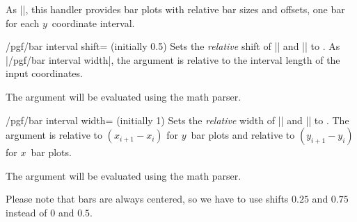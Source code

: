 \begin{command}{\pgfplothandlerxbarinterval}
    As |\pgfplothandlerybarinterval|, this handler provides bar plots with
    relative bar sizes and offsets, one bar for each $y$~coordinate interval.
\end{command}

\begin{key}{/pgf/bar interval shift= (initially 0.5)}
\label{key-bar-interval-shift}%
    Sets the \emph{relative} shift of |\pgfplothandlerxbarinterval| and
    |\pgfplothandlerybarinterval| to . As
    |/pgf/bar interval width|, the argument is relative to the interval length
    of the input coordinates.

    The argument  will be evaluated using the math parser.
\end{key}

\begin{key}{/pgf/bar interval width= (initially 1)}
\label{key-bar-interval-width}%
    Sets the \emph{relative} width of |\pgfplothandlerxbarinterval| and
    |\pgfplothandlerybarinterval| to . The argument is relative to
    $(x_{i+1} - x_i)$ for $y$~bar plots and relative to $(y_{i+1}-y_i)$ for
    $x$~bar plots.

    The argument  will be evaluated using the math parser.
\begin{codeexample}[]
\end{codeexample}
    Please note that bars are always centered, so we have to use shifts $0.25$
    and $0.75$ instead of $0$ and $0.5$.
\end{key}



